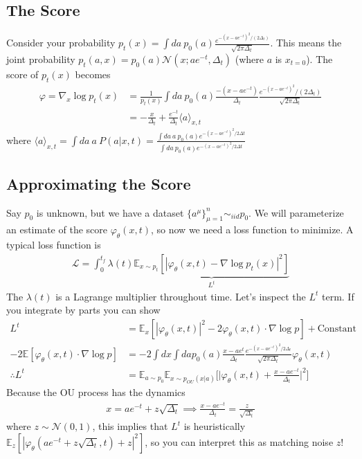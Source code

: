 \subsection{The Score}
\begin{theorem}
\end{theorem}
Consider your probability $p_t(x) = \int da ~p_0(a) \frac{ e^{-(x-a e^{-t})^2 / (2 \Delta_t)}}{\sqrt{2 \pi\Delta_t}}$. This means the joint probability $p_t(a,x) = p_0(a) \mathcal N(x; a e^{-t}, \Delta_t)$ (where $a$ is $x_{t=0}$). The score of $p_t(x)$ becomes
\begin{align}
	\varphi = \nabla_x \log p_t(x)&  = \frac{1}{p_t(x)} \int da~ p_0(a) \frac{-(x-ae^{-t})}{\Delta_t} \frac{e^{-(x-ae^{-t})^2}/(2\Delta_t)}{\sqrt{2\pi \Delta_t}} \\
	& = - \frac{x}{\Delta_t} + \frac{e^{-t}}{\Delta_t} \langle a \rangle_{x,t}
\end{align}
where $\langle a \rangle_{x,t} = \int da ~ a~ P(a | x,t) = \frac{\int da~ a~p_0(a) e^{-(x-a e^{-t})^2/2\Delta t}}{\int da ~p_0(a) e^{-(x-a e^{-t})^2/2\Delta t}}$
\subsection{Approximating the Score}
Say $p_0$ is unknown, but we have a dataset $\{a^\mu\}_{\mu=1}^n \sim_{iid} p_0$. We will parameterize an estimate of the score $\varphi_\theta(x,t)$, so now we need a loss function to minimize. A typical loss function is
\begin{align}
	\mathcal L = \int_0^{t_f} \lambda(t) \underbrace{\mathbb E_{x \sim p_t}[|\varphi_\theta(x,t) - \nabla \log p_t(x)|^2]}_{L^t}
\end{align} 
The $\lambda(t)$ is a Lagrange multiplier throughout time. Let's inspect the $L^t$ term. If you integrate by parts you can show
\begin{align}
	L^t & = \mathbb E_x [|\varphi_\theta(x,t)|^2 - 2\varphi_\theta(x,t)\cdot \nabla \log p] + \text{Constant}\\
	-2 \mathbb E[\varphi_\theta(x,t) \cdot \nabla \log p] & = -2 \int dx \int da p_0(a) \frac{x - ae^t}{\Delta_t} \frac{e^{-(x-a e^{-t})^2 / 2\Delta_t}}{\sqrt{2\pi \Delta_t}} \varphi_\theta(x,t)\\
	\therefore L^t &= \mathbb E_{a\sim p_0} \mathbb E_{x\sim p_{OU}(x|a)} \Big [\Big|\varphi_\theta(x,t) + \frac{x - a e^{-t}}{\Delta_t}\Big|^2 \Big]
\end{align} 
Because the OU process has the dynamics
\begin{align}
	x = a e^{-t} + z \sqrt{\Delta_t} \implies \frac{x -ae^{-t}}{\Delta_t} = \frac{z}{\sqrt{\Delta_t}}
\end{align}
where $z \sim \mathcal N(0,1)$, this implies that $L^t$ is heuristically $\mathbb E_z [|\varphi_\theta(a e^{-t} + z\sqrt{\Delta_t}, t) + z|^2]$, so you can interpret this as matching noise $z$!
